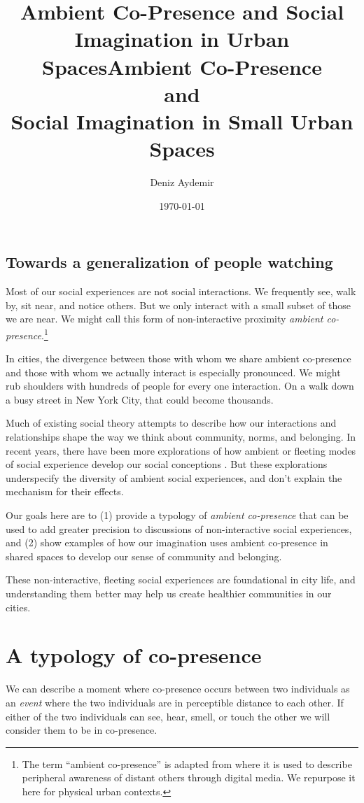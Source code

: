 \documentclass[12pt]{article}
\title{Ambient Co-Presence and Social Imagination in Urban Spaces}
\title{\huge Ambient Co-Presence \\ \large and\\ \vspace{-1em} \huge Social Imagination in Small Urban Spaces}
\author{Deniz Aydemir}
\date{\today}
\begin{document}
\maketitle

\subsection*{Towards a generalization of people watching}
Most of our social experiences are not social interactions. We frequently see, walk by, sit near, and notice others. But we only interact with a small subset of those we are near. We might call this form of non-interactive proximity \textit{ambient co-presence}.\footnote{The term ``ambient co-presence'' is adapted from \citet{madianou2016} where it is used to describe peripheral awareness of distant others through digital media. We repurpose it here for physical urban contexts.}

In cities, the divergence between those with whom we share ambient co-presence and those with whom we actually interact is especially pronounced. We might rub shoulders with hundreds of people for every one interaction. On a walk down a busy street in New York City, that could become thousands.

Much of existing social theory attempts to describe how our interactions and relationships shape the way we think about community, norms, and belonging. In recent years, there have been more explorations of how ambient or fleeting modes of social experience develop our social conceptions \citep{zahnow2025comfort, blokland2014}. But these explorations underspecify the diversity of ambient social experiences, and don't explain the mechanism for their effects. 

Our goals here are to (1) provide a typology of \textit{ambient co-presence} that can be used to add greater precision to discussions of non-interactive social experiences, and (2) show examples of how our imagination uses ambient co-presence in shared spaces to develop our sense of community and belonging. 

These non-interactive, fleeting social experiences are foundational in city life, and understanding them better may help us create healthier communities in our cities.

\section{A typology of co-presence}

We can describe a moment where co-presence occurs between two individuals as an \textit{event} where the two individuals are in perceptible distance to each other. If either of the two individuals can see, hear, smell, or touch the other we will consider them to be in co-presence. 
\end{document}
